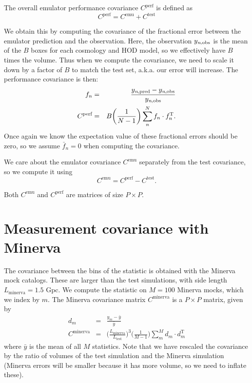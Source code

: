 \documentclass[12pt]{article}
\newcommand{\T}{^{\mathrm{T}}}
\newcommand{\cov}[1]{C^\text{#1}}
\newcommand{\y}[1]{y_{\text{#1}}}
\begin{document}
The overall emulator performance covariance $\cov{perf}$ is defined as
\begin{equation}
    \cov{perf} = \cov{emu} + \cov{test}
\end{equation}

We obtain this by computing the covariance of the fractional error between the emulator prediction and the observation.
Here, the observation $\y{\textit{n},obs}$ is the mean of the $B$ boxes for each cosmology and HOD model, so we effectively have $B$ times the volume.
Thus when we compute the covariance, we need to scale it down by a factor of $B$ to match the test set, a.k.a. our error will increase.
The performance covariance is then:
\begin{eqnarray}
    f_n &=& \frac{ \y{\textit{n},pred} - \y{\textit{n},obs} }{ \y{\textit{n},obs} } \\
    \cov{perf} &=& B \bigg( \frac{1}{N-1} \bigg) \sum_n^N f_n \cdot f_n\T.
\end{eqnarray}
Once again we know the expectation value of these fractional errors should be zero, so we assume $\bar{f}_{n}=0$ when computing the covariance.

We care about the emulator covariance $\cov{emu}$ separately from the test covariance, so we compute it using
\begin{equation}
    \cov{emu} = \cov{perf} - \cov{test}.
\end{equation}

Both $\cov{emu}$ and $\cov{perf}$ are matrices of size $P \times P$.

\section{Measurement covariance with Minerva}

The covariance between the bins of the statistic is obtained with the Minerva mock catalogs. 
These are larger than the test simulations, with side length $L_\text{minerva}=1.5$ Gpc.
We compute the statistic on $M=100$ Minerva mocks, which we index by $m$.
The Minerva covariance matrix $\cov{minerva}$ is a $P \times P$ matrix, given by
\begin{eqnarray}
d_m &=& \frac{y_{m} - \bar{y}}{\bar{y}} \\
\cov{minerva} &=& \bigg( \frac{L_\text{minerva}}{L_\text{test}} \bigg)^3 \bigg( \frac{1}{M-1} \bigg) \sum_m^M d_m \cdot d_m\T
\end{eqnarray}
where $\bar{y}$ is the mean of all $M$ statistics.
Note that we have rescaled the covariance by the ratio of volumes of the test simulation and the Minerva simulation (Minerva errors will be smaller because it has more volume, so we need to inflate these).
\end{document}
